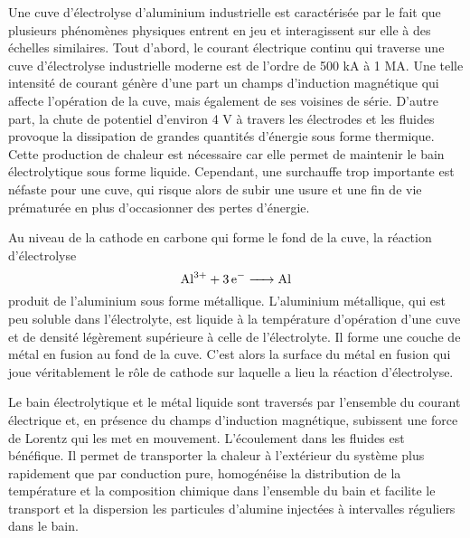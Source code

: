 Une cuve d'électrolyse d'aluminium industrielle est caractérisée par
le fait que plusieurs phénomènes physiques entrent en jeu et
interagissent sur elle à des échelles similaires. Tout d'abord, le courant
électrique continu qui traverse une cuve d'électrolyse industrielle
moderne est de l'ordre de \num{500} \si{\kilo\ampere} à \num{1}
\si{\mega\ampere}. Une telle intensité de courant génère d'une part un
champs d'induction magnétique qui affecte l'opération de la cuve, mais
également de ses voisines de série. D'autre part, la chute de
potentiel d'environ \num{4} \si{\volt} à travers les électrodes et les
fluides \cite{Haupin1995} provoque la dissipation de grandes quantités
d'énergie sous forme thermique. Cette production de chaleur est
nécessaire car elle permet de maintenir le bain électrolytique sous
forme liquide. Cependant, une surchauffe trop importante est
néfaste pour une cuve, qui risque alors de subir une usure et une
fin de vie prématurée en plus d'occasionner des pertes d'énergie.

Au niveau de la cathode en carbone qui forme le fond de la cuve, la
réaction d'électrolyse
\begin{equation}
\cee{Al^{3+} + 3e^- -> Al}
\end{equation}
produit de l'aluminium sous forme métallique. L'aluminium métallique,
qui est peu soluble dans l'électrolyte, est liquide à la température
d'opération d'une cuve et de densité légèrement supérieure à celle de
l'électrolyte. Il forme une couche de métal en fusion au fond de la
cuve. C'est alors la surface du métal en fusion qui joue véritablement
le rôle de cathode sur laquelle a lieu la réaction d'électrolyse.

Le bain électrolytique et le métal liquide sont traversés par
l'ensemble du courant électrique et, en présence du champs d'induction
magnétique, subissent une force de Lorentz qui les met en
mouvement. L'écoulement dans les fluides est bénéfique. Il permet de
transporter la chaleur à l'extérieur du système plus rapidement que
par conduction pure, homogénéise la distribution de la température et
la composition chimique dans l'ensemble du bain et facilite le
transport et la dispersion les particules d'alumine injectées à
intervalles réguliers dans le bain.

